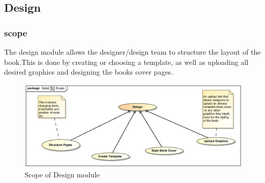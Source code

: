 \clearpage
\subsection{Design}

\subsubsection{scope}
\par{The design module allows the designer/design team to structure the layout of the book.This is done by creating or choosing a template, as well as uploading all desired graphics and designing the books cover pages.}

\begin{figure}[h]
\includegraphics[scale=0.9,width=450px]{epsImages/Design/Scope.eps}
\centering
\caption{Scope of Design module}
\end{figure}

\newpage
